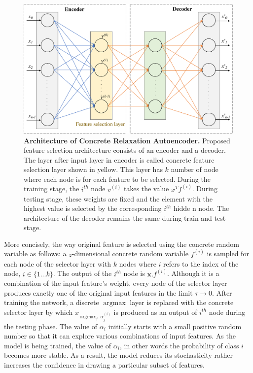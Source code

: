 \documentclass{bioinfo}
\DeclareMathOperator*{\argmax}{argmax}
\begin{document}
\begin{figure}[hbt]
    \centering
    \includegraphics[scale=0.5]{fig/architecture.pdf}
    \caption{\textbf{Architecture of Concrete Relaxation Autoencoder.} Proposed feature selection architecture consists of an encoder and a decoder. The layer after input layer in encoder is called concrete feature selection layer shown in yellow. This layer has $k$ number of node where each node is for each feature to be selected. During the training stage, the $i^{th}$ node $v^{(i)}$ takes the value $x^Tf^{(i)}$.
During testing stage, these weights are fixed and the element with the highest value is selected by the corresponding $i^{th}$ hidde
n node.
The architecture of the decoder remains the same during train and test stage.}
    \label{fig:architecture}
\end{figure}

More concisely, the way original feature is selected using the concrete random variable as follows: a $z$-dimensional concrete random variable $f^{(i)}$ is sampled for each node of the selector layer with $k$ nodes where $i$ refers to the index of the node, $i \in \{1...k\}$. The output of the $i^{th}$ node is $ \textbf{x}.f^{(i)}$. Although it is a combination of the input feature's weight, every node of the selector layer produces exactly one of the original input features in the limit $\tau \to 0$. After training the network, a discrete $\argmax$ layer is replaced with the concrete selector layer by which $x_{\argmax_j \; \alpha_j^{(i)}}$ is produced as an output of $i^{th}$ node during the testing phase. The value of $\alpha_i$ initially starts with a small positive random number so that it can explore various combinations of input features. As the model is being trained, the value of $\alpha_i$, in other words the probability of class $i$ becomes more stable. As a result, the model reduces its stochasticity rather increases the confidence in drawing a particular subset of features. 
\end{document}

